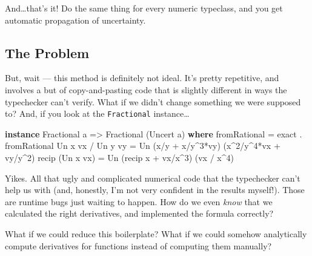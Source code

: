 \documentclass[]{article}
\newenvironment{Shaded}{}{}
\newcommand{\KeywordTok}[1]{\textcolor[rgb]{0.00,0.44,0.13}{\textbf{{#1}}}}
\newcommand{\DataTypeTok}[1]{\textcolor[rgb]{0.56,0.13,0.00}{{#1}}}
\newcommand{\DecValTok}[1]{\textcolor[rgb]{0.25,0.63,0.44}{{#1}}}
\newcommand{\OtherTok}[1]{\textcolor[rgb]{0.00,0.44,0.13}{{#1}}}
\newcommand{\FunctionTok}[1]{\textcolor[rgb]{0.02,0.16,0.49}{{#1}}}
\newcommand{\NormalTok}[1]{{#1}}
\begin{document}
And\ldots{}that's it! Do the same thing for every numeric typeclass, and you get
automatic propagation of uncertainty.

\subsection{The Problem}\label{the-problem}

But, wait --- this method is definitely not ideal. It's pretty repetitive, and
involves a but of copy-and-pasting code that is slightly different in ways the
typechecker can't verify. What if we didn't change something we were supposed
to? And, if you look at the \texttt{Fractional} instance\ldots{}

\begin{Shaded}
\begin{Highlighting}[]
\KeywordTok{instance} \DataTypeTok{Fractional} \NormalTok{a }\OtherTok{=>} \DataTypeTok{Fractional} \NormalTok{(}\DataTypeTok{Uncert} \NormalTok{a) }\KeywordTok{where}
    \NormalTok{fromRational      }\FunctionTok{=} \NormalTok{exact }\FunctionTok{.} \NormalTok{fromRational}
    \DataTypeTok{Un} \NormalTok{x vx }\FunctionTok{/} \DataTypeTok{Un} \NormalTok{y vy }\FunctionTok{=} \DataTypeTok{Un} \NormalTok{(x}\FunctionTok{/}\NormalTok{y }\FunctionTok{+} \NormalTok{x}\FunctionTok{/}\NormalTok{y}\FunctionTok{^}\DecValTok{3}\FunctionTok{*}\NormalTok{vy)   (x}\FunctionTok{^}\DecValTok{2}\FunctionTok{/}\NormalTok{y}\FunctionTok{^}\DecValTok{4}\FunctionTok{*}\NormalTok{vx }\FunctionTok{+} \NormalTok{vy}\FunctionTok{/}\NormalTok{y}\FunctionTok{^}\DecValTok{2}\NormalTok{)}
    \NormalTok{recip (}\DataTypeTok{Un} \NormalTok{x vx)   }\FunctionTok{=} \DataTypeTok{Un} \NormalTok{(recip x }\FunctionTok{+} \NormalTok{vx}\FunctionTok{/}\NormalTok{x}\FunctionTok{^}\DecValTok{3}\NormalTok{) (vx }\FunctionTok{/} \NormalTok{x}\FunctionTok{^}\DecValTok{4}\NormalTok{)}
\end{Highlighting}
\end{Shaded}

Yikes. All that ugly and complicated numerical code that the typechecker can't
help us with (and, honestly, I'm not very confident in the results myself!).
Those are runtime bugs just waiting to happen. How do we even \emph{know} that
we calculated the right derivatives, and implemented the formula correctly?

What if we could reduce this boilerplate? What if we could somehow analytically
compute derivatives for functions instead of computing them manually?
\end{document}
